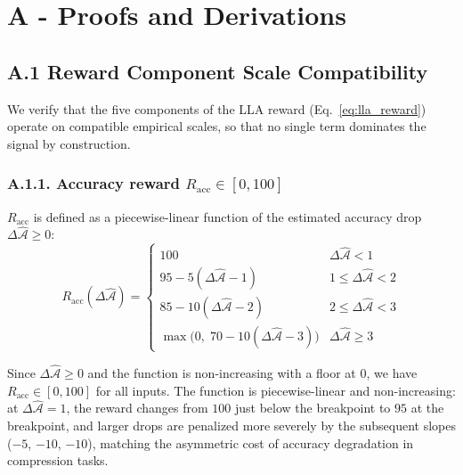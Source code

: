 \documentclass[preprint,12pt,authoryear]{elsarticle}
\begin{document}
\appendix


\section*{A - Proofs and Derivations}

\subsection*{A.1 \; Reward Component Scale Compatibility}

We verify that the five components of the LLA reward (Eq.~\ref{eq:lla_reward}) operate
on compatible empirical scales, so that no single term dominates the signal by
construction.

\subsubsection*{A.1.1. Accuracy reward $R_{\mathrm{acc}} \in [0, 100]$}
$R_{\mathrm{acc}}$ is defined as a piecewise-linear function of the estimated accuracy
drop $\Delta \hat{\mathcal{A}} \geq 0$:
\begin{equation}
    R_{\mathrm{acc}}(\Delta\hat{\mathcal{A}}) =
    \begin{cases}
        100 & \Delta\hat{\mathcal{A}} < 1 \\
        95 - 5(\Delta\hat{\mathcal{A}} - 1)   & 1 \leq \Delta\hat{\mathcal{A}} < 2 \\
        85 - 10(\Delta\hat{\mathcal{A}} - 2)  & 2 \leq \Delta\hat{\mathcal{A}} < 3 \\
        \max\bigl(0,\; 70 - 10(\Delta\hat{\mathcal{A}} - 3)\bigr) & \Delta\hat{\mathcal{A}} \geq 3
    \end{cases}
\end{equation}

Since $\Delta\hat{\mathcal{A}} \geq 0$ and the function is non-increasing with a floor
at $0$, we have $R_{\mathrm{acc}} \in [0, 100]$ for all inputs. The function is
piecewise-linear and non-increasing: at $\Delta\hat{\mathcal{A}} = 1$, the reward
changes from $100$ just below the breakpoint to $95$ at the breakpoint, and larger
drops are penalized more severely by the subsequent slopes ($-5$, $-10$, $-10$),
matching the asymmetric cost of accuracy degradation in compression tasks.
\end{document}
